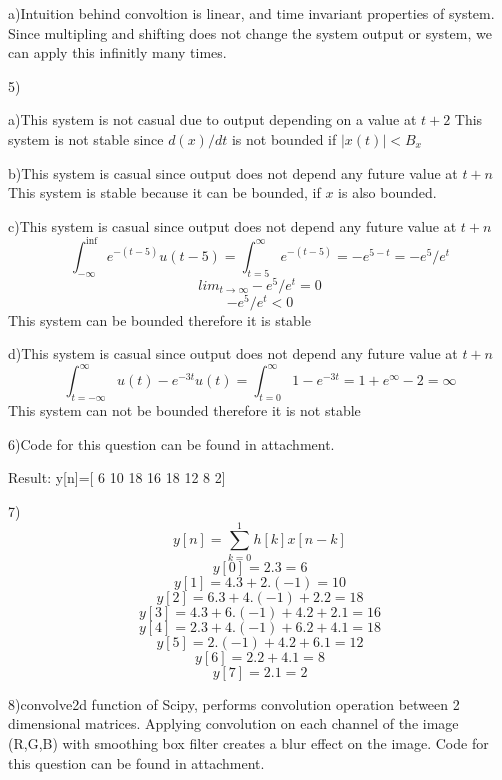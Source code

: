 \documentclass{article}
\begin{document}
	a)Intuition behind convoltion is linear, and time invariant properties of system. Since multipling and shifting does not change the system output or system, we can apply this infinitly many times.
	\par
	
	5)\par
	a)This system is not casual due to output depending on a value at $t+2$
	This system is not stable since $d(x)/dt$ is not bounded if $|x(t)|<B_x$ 
	\par 
	b)This system is casual since output does not depend any future value at $t+n$
	This system is stable because it can be bounded, if $x$ is also bounded.
	\par 
	c)This system is casual since output does not depend any future value at $t+n$
	$$\int_{-\infty}^{\inf}e^{-(t-5)}u(t-5)=\int_{t=5}^{\infty}e^{-(t-5)}=-e^{5-t}=-e^5/e^t$$
	$$lim_{t\rightarrow \infty}-e^5/e^t=0$$
	$$-e^5/e^t<0$$
	This system can be bounded therefore it is stable
	\par 
	d)This system is casual since output does not depend any future value at $t+n$
	$$\int_{t=-\infty}^{\infty}u(t)-e^{-3t}u(t)=\int_{t=0}^{\infty}1-e^{-3t}=1+e^{\infty}-2=\infty$$
	This system can not be bounded therefore it is not stable
	\par
	
	6)Code for this question can be found in attachment.
	\par 
	Result: y[n]=[ 6 10 18 16 18 12  8  2]

	\par
	
	7)$$y[n]=\sum_{k=0}^{1}h[k]x[n-k]$$
	$$y[0]=2.3=6$$
	$$y[1]=4.3+2.(-1)=10$$
	$$y[2]=6.3+4.(-1)+2.2=18$$
	$$y[3]=4.3+6.(-1)+4.2+2.1=16$$
	$$y[4]=2.3+4.(-1)+6.2+4.1=18$$
	$$y[5]=2.(-1)+4.2+6.1=12$$
	$$y[6]=2.2+4.1=8 $$
	$$y[7]=2.1=2 $$
	\par
	
	8)convolve2d function of Scipy, performs convolution operation between 2 dimensional matrices. Applying convolution on each channel of the image (R,G,B) with smoothing box filter creates a blur effect on the image.
	Code for this question can be found in attachment.	
	\par
\end{document}
